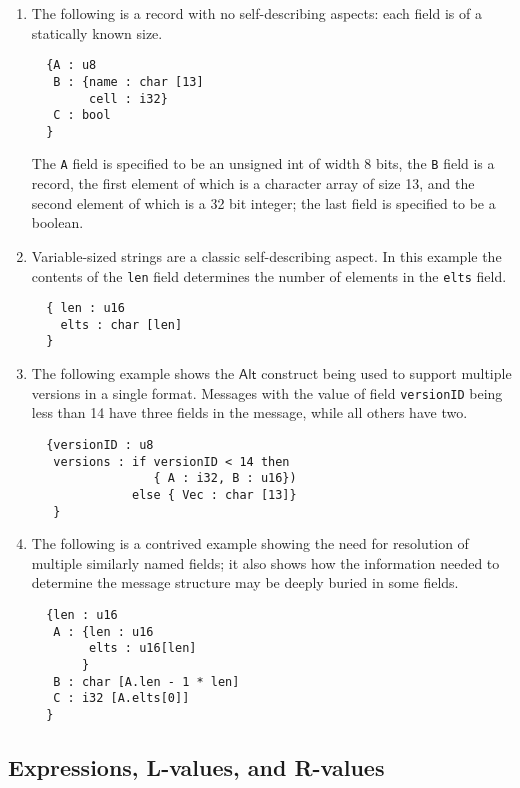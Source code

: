 \documentclass[a4paper,UKenglish,cleveref, autoref, thm-restate]{lipics-v2021}
\newcommand{\konst}[1]{\ensuremath{\mathsf{#1}}}
\begin{document}
\begin{enumerate}

\item The following is a record with no self-describing aspects: each
  field is of a statically known size.

{\small
\begin{verbatim}
  {A : u8
   B : {name : char [13]
        cell : i32}
   C : bool
  }
\end{verbatim}
}
The \verb+A+ field is specified to be an unsigned int of width 8 bits,
the \verb+B+ field is a record, the first element of which is a
character array of size 13, and the second element of which is a 32
bit integer; the last field is specified to be a
boolean.

\item Variable-sized strings are a classic self-describing aspect. In
  this example the contents of the \verb+len+ field determines the
  number of elements in the \verb+elts+ field.

{\small
\begin{verbatim}
  { len : u16
    elts : char [len]
  }
\end{verbatim}
}

\item The following example shows the \konst{Alt} construct being
  used to support multiple versions in a single format.  Messages with
  the value of field \verb+versionID+ being less than 14 have three
  fields in the message, while all others have two.

{\small
\begin{verbatim}
  {versionID : u8
   versions : if versionID < 14 then
                 { A : i32, B : u16})
              else { Vec : char [13]}
   }
\end{verbatim}
}

\item The following is a contrived example showing the need for
  resolution of multiple similarly named fields; it also shows how the
  information needed to determine the message structure may be deeply
  buried in some fields.
{\small
\begin{verbatim}
  {len : u16
   A : {len : u16
        elts : u16[len]
       }
   B : char [A.len - 1 * len]
   C : i32 [A.elts[0]]
  }
\end{verbatim}
}
\end{enumerate}

\subsection{Expressions, L-values, and R-values}
\end{document}
